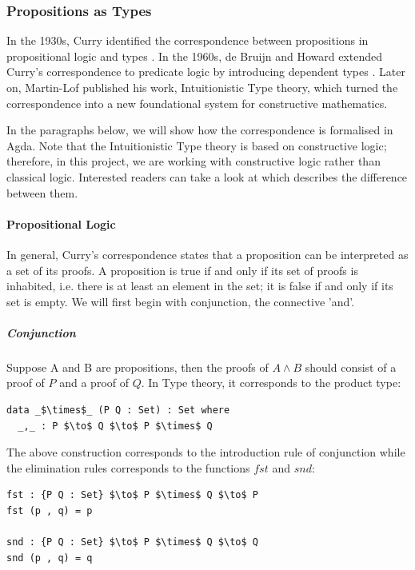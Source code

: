 \documentclass[twoside,openright,final]{bhamthesis}
\begin{document}
\subsubsection{Propositions as Types}
\par In the 1930s, Curry identified the
correspondence between propositions in propositional logic and types
\cite{curry1934}. In the 1960s, de Bruijn and Howard extended
Curry's correspondence to predicate logic by introducing dependent
types \cite{bruijn1968, howard1969}. Later on, Martin-Lof published
his work, Intuitionistic Type theory\cite{martin1984}, which turned the correspondence into a new
foundational system for constructive mathematics. 
\par In the paragraphs below, we will show how the correspondence is
formalised in Agda. Note that the Intuitionistic Type
theory is based on constructive logic; therefore, in this project, we
are working with constructive logic rather than classical logic. Interested readers can take a look at
\cite{avigad2000} which describes the difference between them. 

\paragraph{Propositional Logic} In general, Curry's correspondence
states that a proposition can be interpreted as a set of its proofs. A
proposition is true if and only if its set of proofs is inhabited,
i.e. there is at least an element in the set; it is false if and only
if its set is empty. We will first begin with conjunction, the
connective 'and'. 

\subparagraph{Conjunction} Suppose A and B are propositions, then the
proofs of \(A \wedge B\) should consist of
a proof of \(P\) and a proof of \(Q\). In Type theory, it corresponds
to the product type:  
\begin{lstlisting}[mathescape=true,xleftmargin=.3\textwidth]
data _$\times$_ (P Q : Set) : Set where
  _,_ : P $\to$ Q $\to$ P $\times$ Q
\end{lstlisting} 
\par The above construction corresponds to the introduction rule of
conjunction while the elimination rules corresponds to the functions
\(fst\) and \(snd\):
\begin{lstlisting}[mathescape=true,xleftmargin=.3\textwidth]
fst : {P Q : Set} $\to$ P $\times$ Q $\to$ P
fst (p , q) = p

snd : {P Q : Set} $\to$ P $\times$ Q $\to$ Q
snd (p , q) = q
\end{lstlisting} 
\end{document}
